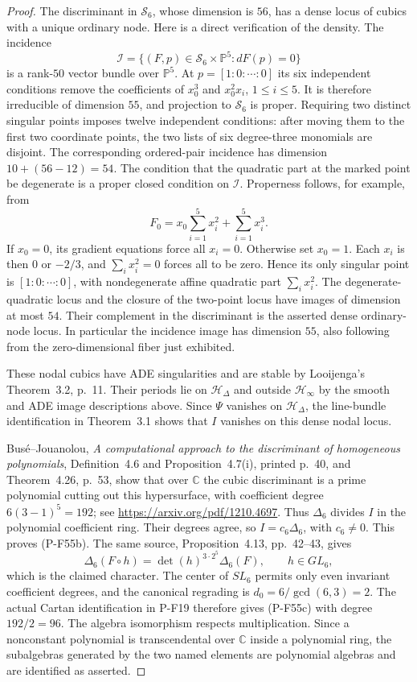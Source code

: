 \begin{proof}
The discriminant in $\mathscr S_6$, whose dimension is $56$,
has a dense locus of cubics with a unique ordinary node.
Here is a direct verification of the density. The incidence
\[
  \mathscr I=\{(F,p)\in\mathscr S_6\times\mathbb P^5:
                                  dF(p)=0\}
\]
is a rank-$50$ vector bundle over $\mathbb P^5$. At
$p=[1:0:\cdots:0]$ its six independent conditions remove
the coefficients of $x_0^3$ and $x_0^2x_i$, $1\le i\le5$.
It is therefore irreducible of dimension $55$, and projection
to $\mathscr S_6$ is proper. Requiring two distinct singular
points imposes twelve independent conditions: after moving
them to the first two coordinate points, the two lists of
six degree-three monomials are disjoint. The corresponding
ordered-pair incidence has dimension $10+(56-12)=54$.
The condition that the quadratic part at the marked point be
degenerate is a proper closed condition on $\mathscr I$.
Properness follows, for example, from
\[
        F_0=x_0\sum_{i=1}^5x_i^2+\sum_{i=1}^5x_i^3.
 \tag{P-F55f}
\]
If $x_0=0$, its gradient equations force all $x_i=0$.
Otherwise set $x_0=1$. Each $x_i$ is then $0$ or $-2/3$,
and $\sum_i x_i^2=0$ forces all to be zero. Hence its only
singular point is $[1:0:\cdots:0]$, with nondegenerate affine
quadratic part $\sum_i x_i^2$.
The degenerate-quadratic locus and the closure of the
two-point locus have images of dimension at most $54$.
Their complement in the discriminant is the asserted dense
ordinary-node locus. In particular the incidence image has
dimension $55$, also following from the zero-dimensional
fiber just exhibited.

These nodal cubics have ADE singularities and are stable by
Looijenga's Theorem~3.2, p.~11. Their periods lie on
$\mathcal H_\Delta$ and outside $\mathcal H_\infty$ by
the smooth and ADE image descriptions above.
Since $\Psi$ vanishes on $\mathcal H_\Delta$, the
line-bundle identification in Theorem~3.1 shows that $I$
vanishes on this dense nodal locus.

Bus\'e--Jouanolou, \emph{A computational approach to the
discriminant of homogeneous polynomials}, Definition~4.6 and
Proposition~4.7(i), printed p.~40, and Theorem~4.26, p.~53,
show that over $\mathbb C$ the cubic discriminant is a prime
polynomial cutting out this hypersurface, with coefficient
degree $6(3-1)^5=192$; see
\url{https://arxiv.org/pdf/1210.4697}.
Thus $\Delta_6$ divides $I$ in the polynomial coefficient
ring. Their degrees agree, so $I=c_6\Delta_6$, with
$c_6\ne0$. This proves (P-F55b).
The same source, Proposition~4.13, pp.~42--43, gives
\[
          \Delta_6(F\circ h)=\det(h)^{3\cdot2^5}\Delta_6(F),
                       \qquad h\in GL_6,
 \tag{P-F55g}
\]
which is the claimed character.
The center of $SL_6$ permits only even invariant coefficient
degrees, and the canonical regrading is $d_0=6/\gcd(6,3)=2$.
The actual Cartan identification in P-F19 therefore gives
(P-F55c) with degree $192/2=96$. The algebra isomorphism
respects multiplication. Since a nonconstant polynomial is
transcendental over $\mathbb C$ inside a polynomial ring,
the subalgebras generated by the two named elements are
polynomial algebras and are identified as asserted.


\end{proof}
